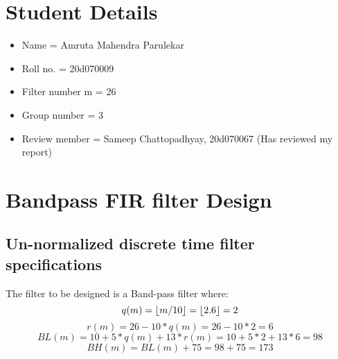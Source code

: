 \documentclass[12pt]{article}
\DeclarePairedDelimiter\floor{\lfloor}{\rfloor}
\begin{document}

\newpage
\tableofcontents
\newpage
\section{Student Details} %
\begin{itemize}[nolistsep]
    \item Name = Amruta Mahendra Parulekar
    \item Roll no. = 20d070009
    \item Filter number m = 26
    \item Group number = 3
    \item Review member = Sameep Chattopadhyay, 20d070067 (Has reviewed my report)
\end{itemize}
\section{Bandpass FIR filter Design}
\subsection{Un-normalized discrete time filter specifications}

  
    The filter to be designed is a Band-pass filter where:
    \begin{equation}
        q(m) = \floor{m/10} = \floor{2.6} = 2
    \end{equation}
    \begin{equation}
        r(m) = 26 - 10*q(m) = 26 - 10*2 = 6
    \end{equation}
    \begin{equation}
        BL(m) = 10 + 5*q(m) + 13*r(m) = 10 + 5*2 + 13*6 = 98
    \end{equation}
    \begin{equation}
        BH(m) = BL(m) + 75 = 98 + 75 = 173
    \end{equation}
  
\end{document}
